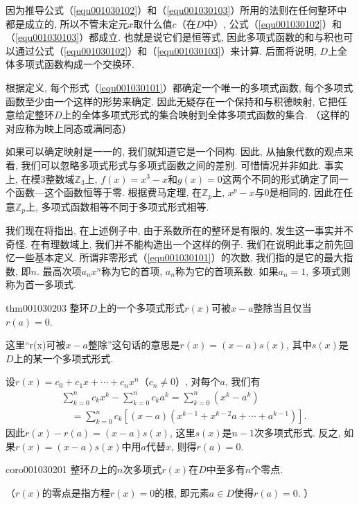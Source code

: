 因为推导公式（\ref{equ001030102}）和（\ref{equ001030103}）所用的法则在任何整环中都是成立的, 所以不管未定元$x$取什么值$c$（在$D$中）, 公式（\ref{equ001030102}）和（\ref{equ001030103}）都成立. 也就是说它们是恒等式, 因此多项式函数的和与积也可以通过公式（\ref{equ001030102}）和（\ref{equ001030103}）来计算. 后面将说明, $D$上全体多项式函数构成一个交换环. 

根据定义, 每个形式（\ref{equ001030101}）都确定一个唯一的多项式函数, 每个多项式函数至少由一个这样的形势来确定. 因此无疑存在一个保持和与积德映射, 它把任意给定整环$D$上的全体多项式形式的集合映射到全体多项式函数的集合. （这样的对应称为映上同态或满同态）

如果可以确定映射是一一的, 我们就知道它是一个同构. 因此, 从抽象代数的观点来看, 我们可以忽略多项式形式与多项式函数之间的差别. 可惜情况并非如此. 事实上, 在模3整数域$\mathbb{Z}_3$上, $f(x)=x^3-x$和$g(x)=0$这两个不同的形式确定了同一个函数---这个函数恒等于零. 根据费马定理, 在$\mathbb{Z}_p$上, $x^p-x$与0是相同的. 因此在任意$\mathbb{Z}_p$上, 多项式函数相等不同于多项式形式相等. 

我们现在将指出, 在上述例子中, 由于系数所在的整环是有限的, 发生这一事实并不奇怪. 在有理数域上, 我们并不能构造出一个这样的例子. 我们在说明此事之前先回忆一些基本定义. 所谓非零形式（\ref{equ001030101}）的次数, 我们指的是它的最大指数, 即$n$. 最高次项$a_nx^n$称为它的首项, $a_n$称为它的首项系数. 如果$a_n=1$, 多项式则称为首一多项式. 
\begin{theorem}{}{thm001030203}
整环$D$上的一个多项式形式$r(x)$可被$x-a$整除当且仅当$r(a)=0$. 
\end{theorem}

这里“r(x)可被$x-a$整除”这句话的意思是$r(x)=(x-a)s(x)$, 其中$s(x)$是$D$上的某一个多项式形式. 

设$r(x)=c_0+c_1x+\cdots+c_nx^n$（$c_n \neq 0$）, 对每个$a$, 我们有
\[
\begin{aligned}
&\sum_{k=0}^{n}{c_kx^k}-\sum_{k=0}^{n}{c_ka^k} = \sum_{k=0}^{n}{(x^k-a^k)}\\
&\quad=\sum_{k=0}^{n}{c_k[(x-a)(x^{k-1} + x^{k-2}a + \cdots + a^{k-1})]}.
\end{aligned}
\]
因此$r(x)-r(a)=(x-a)s(x)$, 这里$s(x)$是$n-1$次多项式形式. 反之, 如果$r(x)=(x-a)s(x)$中用$a$代替$x$, 则得$r(a)=0$. 

\begin{corollary}{}{coro001030201}
整环$D$上的$n$次多项式$r(x)$在$D$中至多有$n$个零点. 
\end{corollary}

（$r(x)$的零点是指方程$r(x)=0$的根, 即元素$a \in D$使得$r(a)=0$. ）

